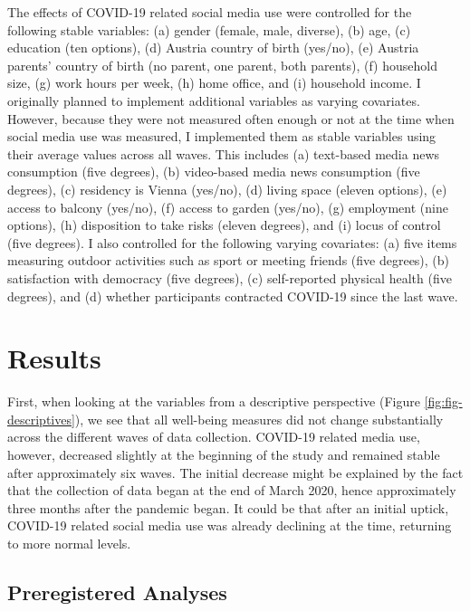 \documentclass[
  man,mask]{apa7}
\begin{document}
The effects of COVID-19 related social media use were controlled for the following stable variables:
(a) gender (female, male, diverse), (b) age, (c) education (ten options), (d) Austria country of birth (yes/no), (e) Austria parents' country of birth (no parent, one parent, both parents), (f) household size, (g) work hours per week, (h) home office, and (i) household income.
I originally planned to implement additional variables as varying covariates.
However, because they were not measured often enough or not at the time when social media use was measured, I implemented them as stable variables using their average values across all waves.
This includes (a) text-based media news consumption (five degrees), (b) video-based media news consumption (five degrees), (c) residency is Vienna (yes/no), (d) living space (eleven options), (e) access to balcony (yes/no), (f) access to garden (yes/no), (g) employment (nine options), (h) disposition to take risks (eleven degrees), and (i) locus of control (five degrees).
I also controlled for the following varying covariates: (a) five items measuring outdoor activities such as sport or meeting friends (five degrees), (b) satisfaction with democracy (five degrees), (c) self-reported physical health (five degrees), and (d) whether participants contracted COVID-19 since the last wave.

\hypertarget{results}{%
\section{Results}\label{results}}

First, when looking at the variables from a descriptive perspective (Figure \ref{fig:fig-descriptives}), we see that all well-being measures did not change substantially across the different waves of data collection.
COVID-19 related media use, however, decreased slightly at the beginning of the study and remained stable after approximately six waves.
The initial decrease might be explained by the fact that the collection of data began at the end of March 2020, hence approximately three months after the pandemic began.
It could be that after an initial uptick, COVID-19 related social media use was already declining at the time, returning to more normal levels.

\hypertarget{preregistered-analyses}{%
\subsection{Preregistered Analyses}\label{preregistered-analyses}}
\end{document}
